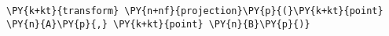 \begin{Verbatim}[commandchars=\\\{\}]
    \PY{k+kt}{transform} \PY{n+nf}{projection}\PY{p}{(}\PY{k+kt}{point} \PY{n}{A}\PY{p}{,} \PY{k+kt}{point} \PY{n}{B}\PY{p}{)}
\end{Verbatim}
